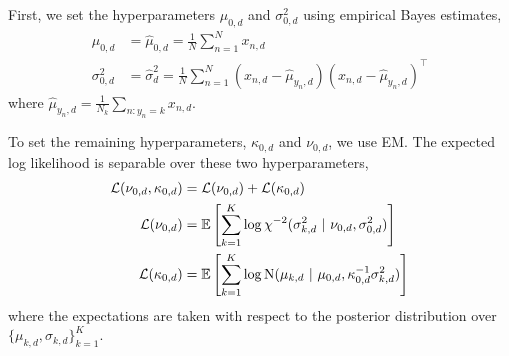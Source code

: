 First, we set the hyperparameters $\mu_{0,d}$ and $\sigma_{0,d}^2$ using empirical Bayes estimates,
\begin{align}
    \mu_{0,d} &= \hat{\mu}_{0,d} = \frac{1}{N} \sum_{n=1}^N x_{n,d} \\
    \sigma_{0,d}^2 &= \hat{\sigma}_{d}^2 = \frac{1}{N} \sum_{n=1}^N (x_{n,d} - \hat{\mu}_{y_n,d})(x_{n,d} - \hat{\mu}_{y_n,d})^\top
\end{align}
where $\hat{\mu}_{y_n,d} = \frac{1}{N_k} \sum_{n: y_n=k} x_{n,d}$.

To set the remaining hyperparameters, $\kappa_{0,d}$ and $\nu_{0,d}$, we use EM. The expected log likelihood is separable over these two hyperparameters,
\begin{align*}
    \mathcal{L}(\nu_{0,d}, \kappa_{0,d}) &= \mathcal{L}(\nu_{0,d}) + \mathcal{L}(\kappa_{0,d}) \\
    \mathcal{L}(\nu_{0,d})
    &= \mathbb{E}\left[\sum_{k=1}^K \log \chi^{-2}(\sigma_{k,d}^2 ~\vert~ \nu_{0,d}, \sigma_{0,d}^2) \right] \\
    \mathcal{L}(\kappa_{0,d})
    &= \mathbb{E} \left[ \sum_{k=1}^K \log \mathrm{N}(\mu_{k,d} ~\vert~ \mu_{0,d}, \kappa_{0,d}^{-1} \sigma_{k,d}^2) \right]
\end{align*}
where the expectations are taken with respect to the posterior distribution over $\{\mu_{k,d}, \sigma_{k,d}\}_{k=1}^K$.

